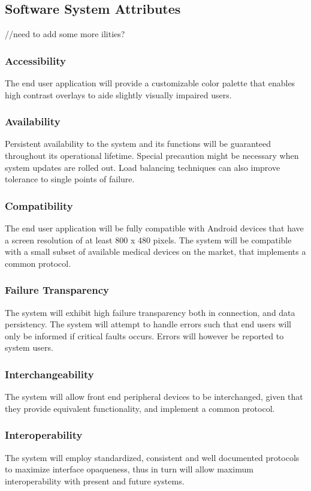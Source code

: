 \subsection{Software System Attributes}
//need to add some more ilities?

\subsubsection{Accessibility}
The end user application will provide a customizable color palette that enables high contrast overlays to aide slightly visually impaired users.

\subsubsection{Availability}
Persistent availability to the system and its functions will be guaranteed throughout its operational lifetime. Special precaution might be necessary when system updates are rolled out. Load balancing techniques can also improve tolerance to single points of failure.

\subsubsection{Compatibility}
The end user application will be fully compatible with Android devices that have a screen resolution of at least 800 x 480 pixels. The system will be compatible with a small subset of available medical devices on the market, that implements a common protocol.

\subsubsection{Failure Transparency}
The system will exhibit high failure transparency both in connection, and data persistency. The system will attempt to handle errors such that end users will only be informed if critical faults occurs. Errors will however be reported to system users.

\subsubsection{Interchangeability}
The system will allow front end peripheral devices to be interchanged, given that they provide equivalent functionality, and implement a common protocol.

\subsubsection{Interoperability}
The system will employ standardized, consistent and well documented protocols to maximize interface opaqueness, thus in turn will allow maximum interoperability with present and future systems.

